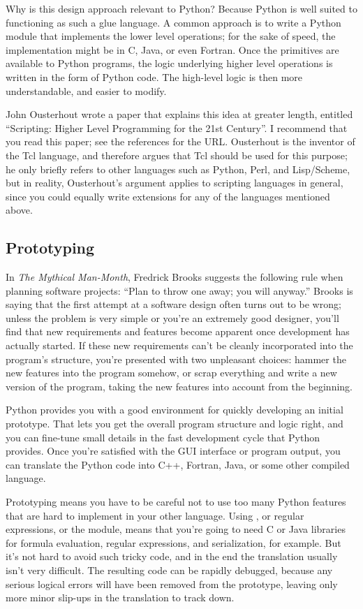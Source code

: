 \documentclass{howto}
\begin{document}
Why is this design approach relevant to Python?  Because Python is
well suited to functioning as such a glue language.  A common approach
is to write a Python module that implements the lower level
operations; for the sake of speed, the implementation might be in C,
Java, or even Fortran.  Once the primitives are available to Python
programs, the logic underlying higher level operations is written in
the form of Python code.  The high-level logic is then more
understandable, and easier to modify.

John Ousterhout wrote a paper that explains this idea at greater
length, entitled ``Scripting: Higher Level Programming for the 21st
Century''.  I recommend that you read this paper; see the references
for the URL.  Ousterhout is the inventor of the Tcl language, and
therefore argues that Tcl should be used for this purpose; he only
briefly refers to other languages such as Python, Perl, and
Lisp/Scheme, but in reality, Ousterhout's argument applies to
scripting languages in general, since you could equally write
extensions for any of the languages mentioned above.

 \subsection{Prototyping}

In \emph{The Mythical Man-Month}, Fredrick Brooks suggests the
following rule when planning software projects: ``Plan to throw one
away; you will anyway.''  Brooks is saying that the first attempt at a
software design often turns out to be wrong; unless the problem is
very simple or you're an extremely good designer, you'll find that new
requirements and features become apparent once development has
actually started.  If these new requirements can't be cleanly
incorporated into the program's structure, you're presented with two
unpleasant choices: hammer the new features into the program somehow,
or scrap everything and write a new version of the program, taking the
new features into account from the beginning.

Python provides you with a good environment for quickly developing an
initial prototype.  That lets you get the overall program structure
and logic right, and you can fine-tune small details in the fast
development cycle that Python provides.  Once you're satisfied with
the GUI interface or program output, you can translate the Python code
into C++, Fortran, Java, or some other compiled language.

Prototyping means you have to be careful not to use too many Python
features that are hard to implement in your other language.  Using
, or regular expressions, or the  module,
means that you're going to need C or Java libraries for formula
evaluation, regular expressions, and serialization, for example.  But
it's not hard to avoid such tricky code, and in the end the
translation usually isn't very difficult.  The resulting code can be
rapidly debugged, because any serious logical errors will have been
removed from the prototype, leaving only more minor slip-ups in the
translation to track down.  
\end{document}
